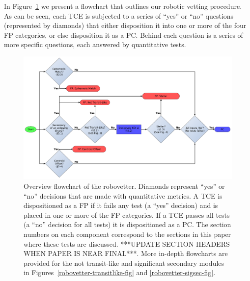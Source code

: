 \noindent In Figure~\ref{robovetter-overview-fig} we present a flowchart that outlines our robotic vetting procedure. As can be seen, each TCE is subjected to a series of ``yes'' or ``no'' questions (represented by diamonds) that either disposition it into one or more of the four FP categories, or else disposition it as a PC. Behind each question is a series of more specific questions, each answered by quantitative tests. 






\begin{figure}[ht]
\centering
\includegraphics[width=\linewidth]{RoboVetter-Diagram-V4-Overview.pdf}
\caption{Overview flowchart of the robovetter. Diamonds represent ``yes'' or ``no'' decisions that are made with quantitative metrics. A TCE is dispositioned as a FP if it fails any test (a ``yes'' decision) and is placed in one or more of the FP categories. If a TCE passes all tests (a ``no'' decision for all tests) it is dispositioned as a PC. The section numbers on each component correspond to the sections in this paper where these tests are discussed. ***UPDATE SECTION HEADERS WHEN PAPER IS NEAR FINAL***. More in-depth flowcharts are provided for the not transit-like and significant secondary modules in Figures~\ref{robovetter-transitlike-fig} and \ref{robovetter-sigsec-fig}.}
\label{robovetter-overview-fig}
\end{figure}


